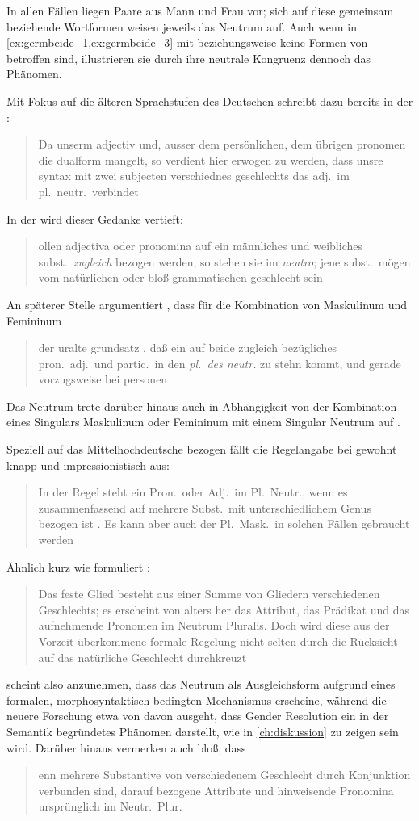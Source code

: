 In allen Fällen liegen Paare aus Mann und Frau vor; sich auf diese gemeinsam
beziehende Wortformen weisen jeweils das Neutrum auf. Auch wenn in
\cref{ex:germbeide_1,ex:germbeide_3} mit   beziehungsweise   keine Formen von  betroffen sind,
illustrieren sie durch ihre neutrale Kongruenz dennoch das Phänomen.

Mit Fokus auf die älteren Sprachstufen des Deutschen schreibt dazu bereits
\citeauthor{grimm1848} in der :
\blockcquote[978]{grimm1848}{Da unserm adjectiv und, ausser dem
persönlichen, dem übrigen pronomen die dualform mangelt, so verdient hier
erwogen zu werden, dass unsre syntax mit zwei subjecten verschiednes
geschlechts das adj.\ im pl.~neutr.\ verbindet}. In der  wird dieser Gedanke vertieft:
\blockcquote[311--312]{grimm1890}{ollen adjectiva oder pronomina
auf ein männliches und weibliches subst.\ \emph{zugleich} bezogen werden, so
stehen sie im \emph{neutro}; jene subst.\ mögen vom natürlichen oder bloß
grammatischen geschlecht sein}. An späterer Stelle argumentiert
\citeauthor{grimm1898}, dass für die Kombination von Maskulinum und Femininum
\blockcquote[329]{grimm1898}{der uralte grundsatz , daß ein auf
beide zugleich bezügliches pron.\ adj.\ und partic.\ in den \emph{pl.\ des
neutr.} zu stehn kommt, und gerade vorzugsweise bei personen}. Das Neutrum
trete darüber hinaus auch in Abhängigkeit von der Kombination eines Singulars
Maskulinum oder Femininum mit einem Singular Neutrum auf
\autocite[331]{grimm1898}.

Speziell auf das Mittelhochdeutsche bezogen fällt die Regelangabe bei
\citeauthor{paul2007} gewohnt knapp und impressionistisch aus:
\blockcquote[384]{paul2007}{In der Regel steht ein Pron.\ oder Adj.\ im
Pl.~Neutr., wenn es zusammenfassend auf mehrere Subst.\ mit unterschiedlichem
Genus bezogen ist \textelp{}. Es kann aber auch der Pl.~Mask.\ in solchen
Fällen gebraucht werden}. Ähnlich kurz wie \citet{paul2007} formuliert
\citet[39]{behaghel1928}: \blockquote{Das feste Glied besteht aus einer Summe
von Gliedern verschiedenen Geschlechts; es erscheint von alters her das
Attribut, das Prädikat und das aufnehmende Pronomen im Neutrum Pluralis.
\textelp{} Doch wird diese aus der Vorzeit überkommene formale Regelung nicht
selten durch die Rücksicht auf das natürliche Geschlecht durchkreuzt}.

\citet{behaghel1928} scheint also anzunehmen, dass das Neutrum als
Ausgleichsform aufgrund eines formalen, morphosyntaktisch bedingten Mechanismus
erscheine, während die neuere Forschung etwa von
\citet{wechslerzlatic2003,wechsler2009} davon ausgeht, dass Gender Resolution
ein in der Semantik begründetes Phänomen darstellt, wie in \cref{ch:diskussion}
zu zeigen sein wird. Darüber hinaus vermerken auch \citet[188]{dal2014} bloß,
dass \blockquote{enn mehrere Substantive von verschiedenem
Geschlecht durch Konjunktion verbunden sind, \textelp{} darauf bezogene
Attribute und hinweisende Pronomina ursprünglich im Neutr.\ Plur.\
}.

